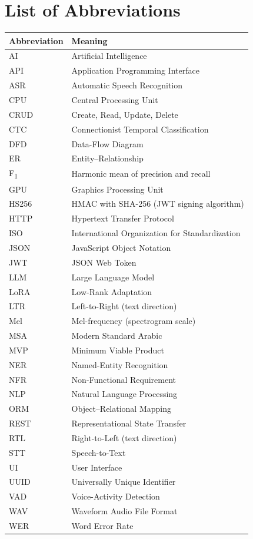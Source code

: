 \chapter*{List of Abbreviations}

\begin{center}
\renewcommand{\arraystretch}{1.25}
\begin{tabularx}{\textwidth}{l X}
\toprule
\textbf{Abbreviation} & \textbf{Meaning} \\
\midrule
AI    & Artificial Intelligence \\
API   & Application Programming Interface \\
ASR   & Automatic Speech Recognition \\
CPU   & Central Processing Unit \\
CRUD  & Create, Read, Update, Delete \\
CTC   & Connectionist Temporal Classification \\
DFD   & Data-Flow Diagram \\
ER    & Entity--Relationship \\
F\textsubscript{1} & Harmonic mean of precision and recall \\
GPU   & Graphics Processing Unit \\
HS256 & HMAC with SHA-256 (JWT signing algorithm) \\
HTTP  & Hypertext Transfer Protocol \\
ISO   & International Organization for Standardization \\
JSON  & JavaScript Object Notation \\
JWT   & JSON Web Token \\
LLM   & Large Language Model \\
LoRA  & Low-Rank Adaptation \\
LTR   & Left-to-Right (text direction) \\
Mel   & Mel-frequency (spectrogram scale) \\
MSA   & Modern Standard Arabic \\
MVP   & Minimum Viable Product \\
NER   & Named-Entity Recognition \\
NFR   & Non-Functional Requirement \\
NLP   & Natural Language Processing \\
ORM   & Object--Relational Mapping \\
REST  & Representational State Transfer \\
RTL   & Right-to-Left (text direction) \\
STT   & Speech-to-Text \\
UI    & User Interface \\
UUID  & Universally Unique Identifier \\
VAD   & Voice-Activity Detection \\
WAV   & Waveform Audio File Format \\
WER   & Word Error Rate \\
\bottomrule
\end{tabularx}
\end{center}
\clearpage
